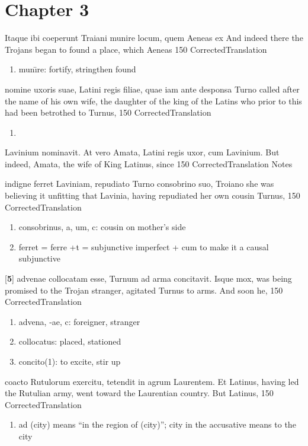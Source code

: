 \chapter*{Chapter 3}
\label{sec:chapter_3}

\latline
  {Itaque ibi coeperunt Traiani munire locum, quem Aeneas ex}
  { And indeed there the Trojans began to found a place, which Aeneas }
  {150}
  { CorrectedTranslation }
  { \begin{enumerate}
  	\item mun\={\i}re:  fortify, stringthen found
  \end{enumerate} }


\latline
  {nomine uxoris suae, Latini regis filiae, quae iam ante desponsa Turno}
  { called after the name of his own wife, the daughter of the king of the Latins who prior to this had been betrothed to Turnus, }
  {150}
  { CorrectedTranslation }
  { \begin{enumerate}
  	\item 
  \end{enumerate} }


\latline
  {Lavinium nominavit.  At vero Amata, Latini regis uxor, cum}
  { Lavinium.  But indeed, Amata, the wife of King Latinus, since}
  {150}
  { CorrectedTranslation }
  { Notes }


\latline
  {indigne ferret Laviniam, repudiato Turno consobrino suo, Troiano}
  { she was believing it unfitting that Lavinia, having repudiated her own cousin Turnus,  }
  {150}
  { CorrectedTranslation }
  { \begin{enumerate}
  	\item  consobrinus, a, um, c:  cousin on mother's side
  	\item ferret = ferre +t = subjunctive imperfect + cum to make it a causal subjunctive
  \end{enumerate} }


\latline
  {[\textbf{5}] advenae collocatam esse, Turnum ad arma concitavit.  Isque mox,}
  { was being promised to the Trojan stranger, agitated Turnus to arms.  And soon he, }
  {150}
  { CorrectedTranslation }
  { \begin{enumerate}
  	\item advena, -ae, c:  foreigner, stranger
  	\item collocatus:  placed, stationed
  	\item concito(1):  to excite, stir up
  \end{enumerate} }


\latline
  {coacto Rutulorum exercitu, tetendit in agrum Laurentem.  Et Latinus,}
  { having led the Rutulian army, went toward the Laurentian country.  But Latinus, }
  {150}
  { CorrectedTranslation }
  { \begin{enumerate}
  	\item ad (city) means ``in the region of (city)''; city in the accusative means to the city
  \end{enumerate} }


